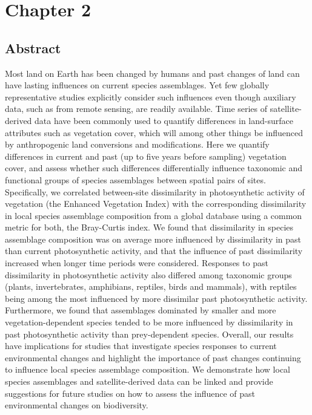 \chapter{Chapter 2}

\section{Abstract} %
Most land on Earth has been changed by humans and past changes of land can have lasting influences on current species assemblages. Yet few globally representative studies explicitly consider such influences even though auxiliary data, such as from remote sensing, are readily available. Time series of satellite-derived data have been commonly used to quantify differences in land-surface attributes such as vegetation cover, which will among other things be influenced by anthropogenic land conversions and modifications. Here we quantify differences in current and past (up to five years before sampling) vegetation cover, and assess whether such differences differentially influence taxonomic and functional groups of species assemblages between spatial pairs of sites. Specifically, we correlated between-site dissimilarity in photosynthetic activity of vegetation (the Enhanced Vegetation Index) with the corresponding dissimilarity in local species assemblage composition from a global database using a common metric for both, the Bray-Curtis index. We found that dissimilarity in species assemblage composition was on average more influenced by dissimilarity in past than current photosynthetic activity, and that the influence of past dissimilarity increased when longer time periods were considered. Responses to past dissimilarity in photosynthetic activity also differed among taxonomic groups (plants, invertebrates, amphibians, reptiles, birds and mammals), with reptiles being among the most influenced by more dissimilar past photosynthetic activity. Furthermore, we found that assemblages dominated by smaller and more vegetation-dependent species tended to be more influenced by dissimilarity in past photosynthetic activity than prey-dependent species. Overall, our results have implications for studies that investigate species responses to current environmental changes and highlight the importance of past changes continuing to influence local species assemblage composition. We demonstrate how local species assemblages and satellite-derived data can be linked and provide suggestions for future studies on how to assess the influence of past environmental changes on biodiversity.

